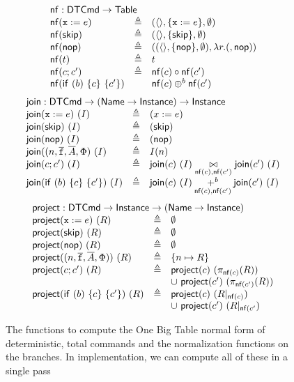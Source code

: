 \begin{figure}[tp]
  \[
    \begin{array}{l c l}
      \multicolumn 3 l {\nf : \DTCmd \to \Table}\\
      \nf(\var x := e)
      &\triangleq
      &(\langle\rangle, \{\var x:=e\}, \emptyset) \\
      \nf(\SKIP)
      &\triangleq
      & (\langle\rangle, \{\SKIP\}, \emptyset) \\
      \nf(\nop)
      &\triangleq
      & ((\langle\rangle, \{\nop\}, \emptyset), \lambda r. (,\nop)) \\
      \nf(t)
      &\triangleq
      & t \\
      \nf(c;c')
      &\triangleq
      & \nf(c) \circ \nf(c') \\
      \nf (\ifte b c {c'})
      && \nf(c) \oplus^b \nf(c')
    \end{array}\]
  \[\begin{array}{lcl}
      \multicolumn 3 l {\join : \DTCmd \to (\Name \to \Instance) \to \Instance}\\
      \join(\var x := e)~(I)
      &\triangleq
      & (x:=e) \\
      \join(\SKIP)~(I)
      &\triangleq
      & (\SKIP) \\
      \join(\nop)~(I)
      & \triangleq
      & (\nop)\\
      \join((n, \vec{\var f}, \vec A, \Phi)~(I)
      &\triangleq
      & I(n)\\
      \join(c;c')~(I)
      &\triangleq
      & \join(c)~(I) \underset{\nf(c),\nf(c')}{\bowtie} \join(c')~(I)\\
      \join(\ifte b c {c'})~(I)
      &\triangleq 
      & \join(c)~(I) \underset{{\nf(c),\nf(c')}}{+^b}\join(c')~(I)
    \end{array}\]
  \[\begin{array}{lcl}        
      \multicolumn 3 l {\project : \DTCmd \to \Instance \to (\Name \to \Instance)}\\
      \project(\var x := e)~(R)
      &\triangleq
      & \emptyset \\
      \project(\SKIP)~(R)
      &\triangleq
      & \emptyset \\
      \project(\nop)~(R)
      & \triangleq
      & \emptyset \\
      \project((n,\vec{\var f}, \vec A, \Phi))~(R)
      &\triangleq
      & \{n \mapsto R\}\\
      \project(c;c')~(R)
      &\triangleq
      & \project(c)~(\pi_{\nf(c)}(R)) \\
      && \cup~\project(c')~(\pi_{\nf(c')}(R))\\
      \project(\ifte b c {c'})~(R)
      &\triangleq 
      & \project(c)~(R|_{\nf(c)}) \\
      && \cup~\project(c')~(R|_{\nf(c'})
    \end{array}
  \]
  \caption{The functions to compute the One Big Table normal form of
    deterministic, total commands and the normalization functions on
    the branches. In implementation, we can compute all of these in
    a single pass}
  \label{fig:normal-form}
\end{figure}